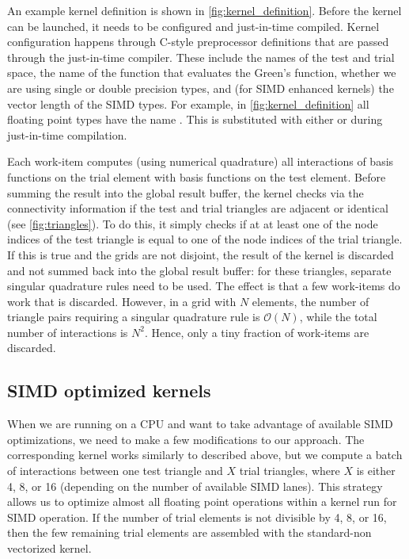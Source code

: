An example kernel definition is shown in \cref{fig:kernel_definition}.
Before the kernel can be launched, it needs to be configured and just-in-time compiled. Kernel configuration happens through C-style preprocessor definitions that are passed through the just-in-time compiler. These include the names of the test and trial space, the name of the function that evaluates the Green's function, whether we are using single or double precision types, and (for SIMD enhanced kernels) the vector length of the SIMD types.
For example, in \cref{fig:kernel_definition} all floating point types have the name . This is substituted with either  or  during just-in-time compilation.

Each work-item computes (using numerical quadrature) all interactions of basis functions on the trial element with basis functions on the test element. Before summing the result into the global result buffer, the kernel checks via the connectivity information if the test and trial triangles are adjacent or identical (see \cref{fig:triangles}). To do this, it simply checks if at at least one of the node indices of the test triangle is equal to one of the node indices of the trial triangle. If this is true and the grids are not disjoint, the result of the kernel is discarded and not summed back into the global result buffer: for these triangles, separate singular quadrature rules need to be used. The effect is that a few work-items do work that is discarded. However, in a grid with $N$ elements, the number of triangle pairs requiring a singular quadrature rule is $\mathcal{O}(N)$, while the total number of interactions is $N^2$. Hence, only a tiny fraction of work-items are discarded.

\subsection{SIMD optimized kernels}
When we are running on a CPU and want to take advantage of available SIMD optimizations, we need to make a few modifications to our approach. The corresponding kernel works similarly to described above, but we compute a batch of interactions between one test triangle and $X$ trial triangles, where $X$ is either 4, 8, or 16 (depending on the number of available SIMD lanes). This strategy allows us to optimize almost all floating point operations within a kernel run for SIMD operation. If the number of trial elements is not divisible by 4, 8, or 16, then the few remaining trial elements are assembled with the standard-non vectorized kernel.

